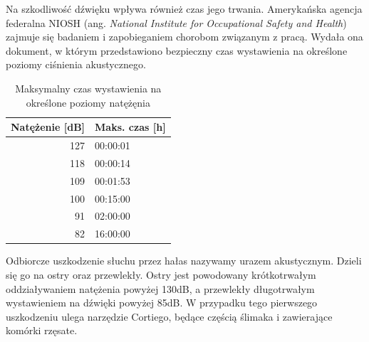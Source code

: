 Na szkodliwość dźwięku wpływa również czas jego trwania. Amerykańska agencja federalna NIOSH (ang. \textit{National Institute for Occupational Safety and Health}) zajmuje się badaniem i zapobieganiem chorobom związanym z pracą. Wydała ona dokument\cite{NIOSH}, w którym przedstawiono bezpieczny czas wystawienia na określone poziomy ciśnienia akustycznego\cite{SPLtable}.

\begin{table}[H]
	\centering
	\begin{tabular}{|r|l|}
		\hline
		Natężenie [dB] & Maks. czas [h] \\
		\hline
		\hline
		127 & 00:00:01 \\
		\hline
		118 & 00:00:14 \\
		\hline
		109 & 00:01:53 \\
		\hline
		100 & 00:15:00 \\
		\hline
		91 & 02:00:00 \\
		\hline
		82 & 16:00:00 \\
		\hline
	\end{tabular}
	\caption{Maksymalny czas wystawienia na określone poziomy natężęnia}
	\label{tab:SPLczas}
\end{table}

Odbiorcze uszkodzenie słuchu przez hałas nazywamy urazem akustycznym. Dzieli się go na ostry oraz przewlekły. Ostry jest powodowany krótkotrwałym oddziaływaniem natężenia powyżej 130dB, a przewlekły długotrwałym wystawieniem na dźwięki powyżej 85dB. W przypadku tego pierwszego uszkodzeniu ulega narzędzie Cortiego, będące częścią ślimaka i zawierające komórki rzęsate\cite{UrazyAkustyczne}.

